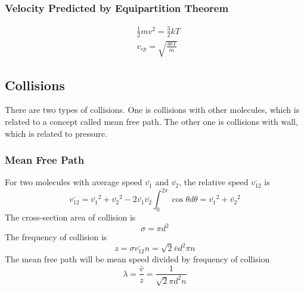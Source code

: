 \documentclass[letterpaper]{article}
\begin{document}
\subsubsection*{Velocity Predicted by Equipartition Theorem}
\begin{equation*}
    \begin{aligned}
        &\frac{1}{2}mv^2=\frac{3}{2}kT\\
        &v_{ep}=\sqrt{\frac{3kT}{m}}
    \end{aligned}
\end{equation*}
\subsection*{Collisions}
There are two types of collisions. One is collisions with other molecules, which is related
to a concept called mean free path. The other one is collisions with wall, which is related
to pressure.
\subsubsection*{Mean Free Path}
For two molecules with average speed $\bar{v_1}$ and $\bar{v_2}$, the relative speed $\bar{v_{12}}$ is
\begin{equation*}
    \bar{v_{12}}=\bar{v_1}^2+\bar{v_2}^2-2\bar{v_1}\bar{v_2}\int_0^{2\pi}\cos\theta d\theta=\bar{v_1}^2+\bar{v_2}^2
\end{equation*}
The cross-section area of collision is
\begin{equation*}
    \sigma=\pi d^2
\end{equation*}
The frequency of collision is
\begin{equation*}
    z=\sigma\bar{v_{12}}n=\sqrt{2}\bar{v}d^2\pi n
\end{equation*}
The mean free path will be mean speed divided by frequency of collision
\begin{equation*}
    \lambda=\frac{\bar{v}}{z}=\frac{1}{\sqrt{2}\pi d^2n}
\end{equation*}
\end{document}
